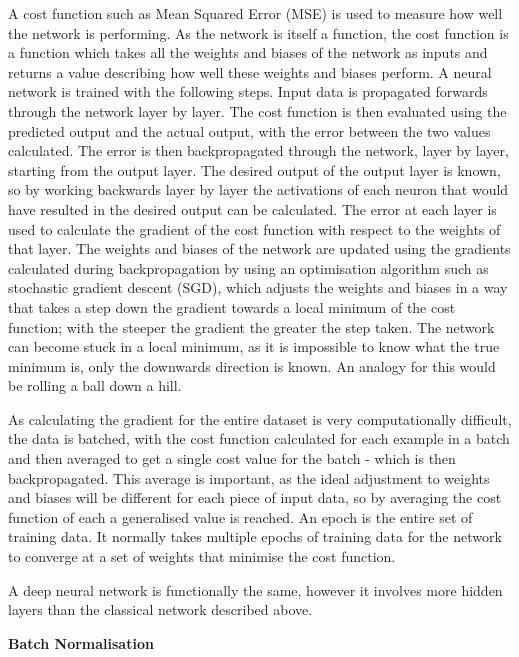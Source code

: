\documentclass[twocolumn]{article}
\begin{document}
A cost function such as Mean Squared Error (MSE) is used to measure how well the network is performing.
As the network is itself a function, the cost function is a function which takes all the weights and biases of the network as inputs and returns a value describing how well these weights and biases perform.
A neural network is trained with the following steps.
Input data is propagated forwards through the network layer by layer.
The cost function is then evaluated using the predicted output and the actual output, with the error between the two values calculated.
The error is then backpropagated through the network, layer by layer, starting from the output layer.
The desired output of the output layer is known, so by working backwards layer by layer the activations of each neuron that would have resulted in the desired output can be calculated.
The error at each layer is used to calculate the gradient of the cost function with respect to the weights of that layer\autocite{leTutorialDeepLearning2015}.
The weights and biases of the network are updated using the gradients calculated during backpropagation by using an optimisation algorithm such as stochastic gradient descent (SGD)\autocite{ruderOverviewGradientDescent2016}, which adjusts the weights and biases in a way that takes a step down the gradient towards a local minimum of the cost function; with the steeper the gradient the greater the step taken.
The network can become stuck in a local minimum, as it is impossible to know what the true minimum is, only the downwards direction is known.
An analogy for this would be rolling a ball down a hill.

As calculating the gradient for the entire dataset is very computationally difficult, the data is batched, with the cost function calculated for each example in a batch and then averaged to get a single cost value for the batch - which is then backpropagated.
This average is important, as the ideal adjustment to weights and biases will be different for each piece of input data, so by averaging the cost function of each a generalised value is reached.
An epoch is the entire set of training data. It normally takes multiple epochs of training data for the network to converge at a set of weights that minimise the cost function.

A deep neural network is functionally the same, however it involves more hidden layers than the classical network described above.

\textbf{Batch Normalisation}
\end{document}
